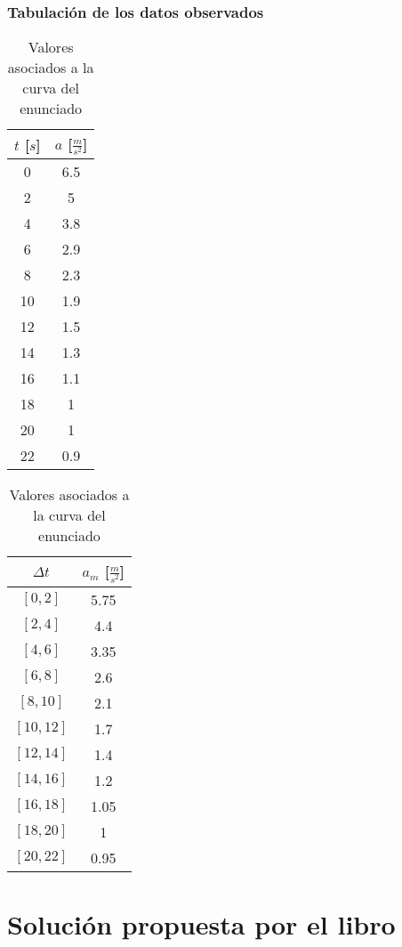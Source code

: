 \documentclass[11pt]{beamer}
\begin{document}
	\begin{frame}
		\frametitle{Tabulación de los datos observados}
		
		\begin{table}[H]
			\centering
			\begin{tabular}{|c|c|}
				\hline
				$t$ [$s$] & $a$ [$\frac{m}{s^{2}}$]\\
				\hline
				0&6.5\\
				\hline
				2&5\\
				\hline
				4&3.8\\
				\hline
				6&2.9\\
				\hline
				8&2.3\\
				\hline
				10&1.9\\
				\hline
				12&1.5\\
				\hline
				14&1.3\\
				\hline
				16&1.1\\
				\hline
				18&1\\
				\hline
				20&1\\
				\hline
				22&0.9\\
				\hline
			\end{tabular}
			\qquad
			\begin{tabular}{|c|c|}
				\hline
				$\Delta t$ & $a_{m}$ [$\frac{m}{s^{2}}$]\\
				\hline
				$[0,2]$&5.75\\
				\hline
				$[2,4]$&4.4\\
				\hline
				$[4,6]$&3.35\\
				\hline
				$[6,8]$&2.6\\
				\hline
				$[8,10]$&2.1\\
				\hline
				$[10,12]$&1.7\\
				\hline
				$[12,14]$&1.4\\
				\hline
				$[14,16]$&1.2\\
				\hline
				$[16,18]$&1.05\\
				\hline
				$[18,20]$&1\\
				\hline
				$[20,22]$&0.95\\
				\hline
			\end{tabular}
			\caption{Valores asociados a la curva del enunciado}
			\label{tab:Aceleraciones}
		\end{table}
	\end{frame}

	\section{Solución propuesta por el libro}
\end{document}
